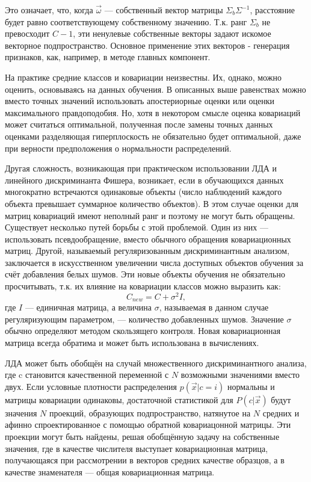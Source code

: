 \documentclass[a4paper,12pt]{report}
\numberwithin{equation}{section}
\begin{document}
Это означает, что, когда $\vec{\omega}$ — собственный вектор матрицы
$\Sigma_b\Sigma^{-1}$, расстояние будет равно соответствующему собственному
значению. Т.к. ранг $\Sigma_b$ не превосходит $C-1$, эти ненулевые собственные
векторы задают искомое векторное подпространство. Основное применение этих
векторов - генерация признаков, как, например, в методе главных компонент.


На практике средние классов и ковариации неизвестны. Их, однако, можно оценить,
основываясь на данных обучения. В описанных выше равенствах можно вместо точных
значений использовать апостериорные оценки или оценки максимального
правдоподобия. Но, хотя в некотором смысле оценка ковариаций может считаться
оптимальной, полученная после замены точных данных оценками разделяющая
гиперплоскость не обязательно будет оптимальной, даже при верности предположения
о нормальности распределений.


Другая сложность, возникающая при практическом использовании ЛДА и линейного
дискриминанта Фишера, возникает, если в обучающихся данных многократно
встречаются одинаковые объекты (число наблюдений каждого объекта превышает
суммарное количество объектов). В этом случае оценки для матриц ковариаций имеют
неполный ранг и поэтому не могут быть обращены. Существует несколько путей
борьбы с этой проблемой. Один из них — использовать псевдообращение, вместо
обычного обращения ковариационных матриц. Другой, называемый регуляризованным
дискриминантным анализом, заключается в искусственном увеличении числа доступных
объектов обучения за счёт добавления белых шумов. Эти новые объекты обучения не
обязательно просчитывать, т.к. их влияние на ковариации классов можно выразить
как:
\[ C_{new}=C+\sigma^2I, \]
где $I$ --- единичная матрица, а величина $\sigma$, называемая в данном случае
регуляризующим параметром, --- количество добавленных шумов. Значение $\sigma$
обычно определяют методом скользящего контроля. Новая ковариационная матрица
всегда обратима и может быть использована в вычислениях.


ЛДА может быть обобщён на случай множественного дискриминантного анализа, где c
становится качественной переменной с $N$ возможными значениями вместо двух. Если
условные плотности распределения $p(\vec{x}|c=i)$ нормальны и матрицы ковариации
одинаковы, достаточной статистикой для $P(c|\vec{x})$ будут значения $N$
проекций, образующих подпространство, натянутое на $N$ средних и афинно
спроектированное с помощью обратной ковариацонной матрицы. Эти проекции могут
быть найдены, решая обобщённую задачу на собственные значения, где в качестве
числителя выступает ковариационная матрица, получающаяся при рассмотрении в
векторов средних качестве образцов, а в качестве знаменателя — общая
ковариационная матрица.
\end{document}
